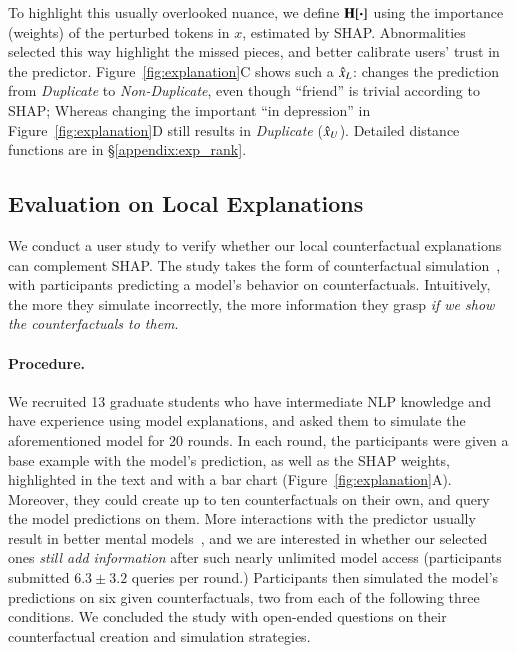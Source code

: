To highlight this usually overlooked nuance, we define $\operatorname*{\mathbf{H}}[\boldsymbol{\cdot}]$ using the importance (weights) of the perturbed tokens in $x$, estimated by SHAP.
Abnormalities selected this way highlight the missed pieces, and better calibrate users' trust in the predictor. 
Figure~\ref{fig:explanation}C shows such a $\hat{x}_L$:  changes the prediction from \emph{Duplicate} to \emph{Non-Duplicate}, even though ``friend'' is trivial according to SHAP; Whereas changing the important ``in depression'' in Figure~\ref{fig:explanation}D still results in \emph{Duplicate} ($\hat{x}_U$).
Detailed distance functions are in \S\ref{appendix:exp_rank}.



\subsection{Evaluation on Local Explanations}
\label{subsec:exp_user_study}

We conduct a user study to verify whether our local counterfactual explanations can complement SHAP.
The study takes the form of counterfactual simulation~\cite{hase2020evaluating}, with participants predicting a model's behavior on counterfactuals.
Intuitively, the more they simulate incorrectly, the more information they grasp \emph{if we show the counterfactuals to them}.

\paragraph{Procedure.}
We recruited 13 graduate students who have intermediate NLP knowledge and have experience using model explanations, and asked them to simulate the aforementioned \qqp model for 20 rounds.
In each round, the participants were given a base example with the model's prediction, as well as the SHAP weights, highlighted in the text and with a bar chart (Figure~\ref{fig:explanation}A).
Moreover, they could create up to ten counterfactuals on their own, and query the model predictions on them.
More interactions with the predictor usually result in better mental models~\cite{miller}, and we are interested in whether our selected ones \emph{still add information} after such nearly unlimited model access (participants submitted $6.3\pm3.2$ queries per round.)
Participants then simulated the model's predictions on six given counterfactuals, two from each of the following three conditions.
We concluded the study with open-ended questions on their counterfactual creation and simulation strategies.

